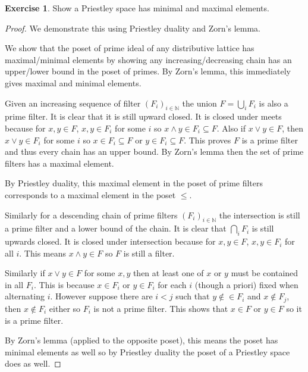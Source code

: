 \documentclass{article}
\newcommand{\N}{\mathbb{N}}
\theoremstyle{definition}
\newtheorem{question}{Exercise}
\begin{document}
\begin{question}
    Show a Priestley space has minimal and maximal elements.

    \begin{proof}
        We demonstrate this using Priestley duality and Zorn's lemma.

        We show that the poset of prime ideal of any distributive lattice has
        maximal/minimal elements by showing any increasing/decreasing chain has
        an upper/lower bound in the poset of primes. By Zorn's lemma, this
        immediately gives maximal and minimal elements.

        Given an increasing sequence of filter \((F_{i})_{i\in\N}\) the union
        \(F=\bigcup_{i}F_{i}\) is also a prime filter. It is clear that it is
        still upward closed. It is closed under meets because for \(x,y\in F\),
        \(x,y\in F_{i}\) for some \(i\) so \(x\wedge y\in F_{i}\subseteq F\).
        Also if \(x\vee y\in F\), then \(x\vee y\in F_{i}\) for some \(i\) so
        \(x\in F_{i}\subseteq F\) or \(y\in F_{i}\subseteq F\). This proves
        \(F\) is a prime filter and thus every chain has an upper bound. By
        Zorn's lemma then the set of prime filters has a maximal element.

        By Priestley duality, this maximal element in the poset of prime filters
        corresponds to a maximal element in the poset \(\leq\).

        Similarly for a descending chain of prime filters \((F_{i})_{i\in\N}\)
        the intersection is still a prime filter and a lower bound of the chain.
        It is clear that \(\bigcap_{i}F_{i}\) is still upwards closed. It is
        closed under intersection because for \(x,y\in F\), \(x,y\in F_{i}\) for
        all \(i\). This means \(x\wedge y\in F\) so \(F\) is still a filter.

        Similarly if \(x\vee y\in F\) for some \(x,y\) then at least one of
        \(x\) or \(y\) must be contained in all \(F_{i}\). This is because
        \(x\in F_{i}\) or \(y\in F_{i}\) for each \(i\) (though a priori) fixed
        when alternating \(i\). However suppose there are \(i<j\) such that
        \(y\notin\in F_{i}\) and \(x\notin F_{j}\), then \(x\notin F_{i}\)
        either so \(F_{i}\) is not a prime filter. This shows that \(x\in F\)
        or \(y\in F\) so it is a prime filter.

        By Zorn's lemma (applied to the opposite poset), this means the poset
        has minimal elements as well so by Priestley duality the poset of a
        Priestley space does as well.
    \end{proof}
\end{question}
\end{document}
